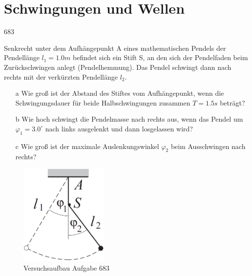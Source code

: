 \section{Schwingungen und Wellen}
\begin{auf}
    683
\end{auf}
Senkrecht unter dem Aufhängepunkt A eines mathematischen Pendels der Pendellänge $l_1=1.0m$ befindet sich ein Stift S, an den sich der Pendelfaden beim Zurückschwingen anlegt (Pendelhemmung). Das Pendel schwingt dann nach rechts mit der verkürzten Pendellänge $l_2$.
\begin{enumerate}
    \item[a] Wie groß ist der Abstand des Stiftes vom Aufhängepunkt, wenn die Schwingungsdauer für beide Halbschwingungen zusammen $T=1.5s$ beträgt?
    \item[b] Wie hoch schwingt die Pendelmasse nach rechts aus, wenn das Pendel um $\varphi_1=3.0^\circ$ nach links ausgelenkt und	dann losgelassen wird?
    \item[c] Wie groß ist der maximale Auslenkungswinkel $\varphi_2$ beim Ausschwingen nach rechts?
\end{enumerate}
\begin{figure}[h]
    \centering
    \includegraphics[height=5cm]{images/683_0.png}
    \caption{Versuchsaufbau Aufgabe 683}
\end{figure}